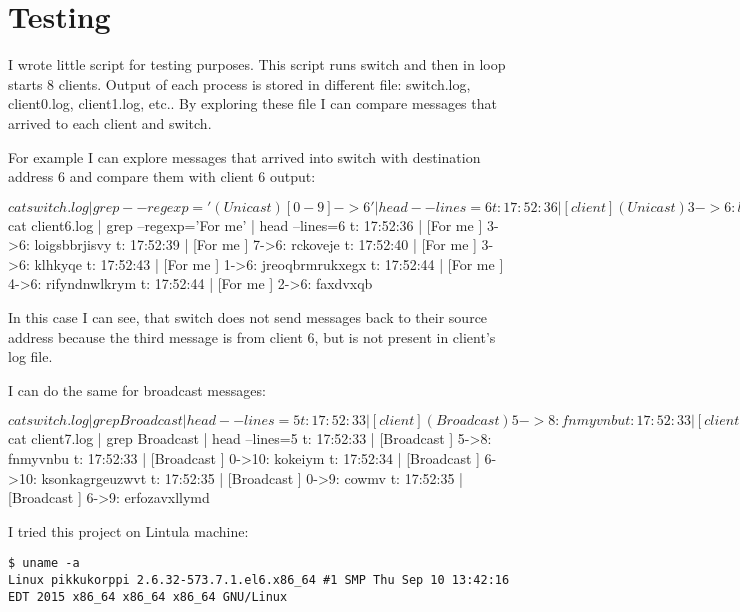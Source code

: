 \documentclass[11pt,a4paper,titlepage]{article}
\begin{document}
\section{Testing}
I wrote little script for testing purposes. This script runs switch and then in loop starts 8 clients. Output of each process is stored in different file: switch.log, client0.log, client1.log, etc.. By exploring these file I can compare messages that arrived to each client and switch.


For example I can explore messages that arrived into switch with destination address 6 and compare them with client 6 output:
\begin{bashcode}
$ cat switch.log | grep --regexp='(Unicast) [0-9]->6' | head --lines=6
t: 17:52:36 | [client] (Unicast) 3->6: loigsbbrjisvy
t: 17:52:39 | [client] (Unicast) 7->6: rckoveje
t: 17:52:40 | [client] (Unicast) 6->6: qhtfwyygvfj
t: 17:52:40 | [client] (Unicast) 3->6: klhkyqe
t: 17:52:43 | [client] (Unicast) 1->6: jreoqbrmrukxegx
t: 17:52:44 | [client] (Unicast) 4->6: rifyndnwlkrym

$ cat client6.log | grep --regexp='For me' | head --lines=6
t: 17:52:36 | [For me    ] 3->6: loigsbbrjisvy
t: 17:52:39 | [For me    ] 7->6: rckoveje
t: 17:52:40 | [For me    ] 3->6: klhkyqe
t: 17:52:43 | [For me    ] 1->6: jreoqbrmrukxegx
t: 17:52:44 | [For me    ] 4->6: rifyndnwlkrym
t: 17:52:44 | [For me    ] 2->6: faxdvxqb
\end{bashcode}
In this case I can see, that switch does not send messages back to their source address because the third message is from client 6, but is not present in client's log file.

I can do the same for broadcast messages:
\begin{bashcode}
$ cat switch.log | grep Broadcast | head --lines=5
t: 17:52:33 | [client] (Broadcast) 5->8: fnmyvnbu
t: 17:52:33 | [client] (Broadcast) 0->10: kokeiym
t: 17:52:34 | [client] (Broadcast) 6->10: ksonkagrgeuzwvt
t: 17:52:35 | [client] (Broadcast) 0->9: cowmv
t: 17:52:35 | [client] (Broadcast) 6->9: erfozavxllymd

$ cat client7.log | grep Broadcast | head --lines=5
t: 17:52:33 | [Broadcast ] 5->8: fnmyvnbu
t: 17:52:33 | [Broadcast ] 0->10: kokeiym
t: 17:52:34 | [Broadcast ] 6->10: ksonkagrgeuzwvt
t: 17:52:35 | [Broadcast ] 0->9: cowmv
t: 17:52:35 | [Broadcast ] 6->9: erfozavxllymd
\end{bashcode}

I tried this project on Lintula machine:
\begin{verbatim}
$ uname -a
Linux pikkukorppi 2.6.32-573.7.1.el6.x86_64 #1 SMP Thu Sep 10 13:42:16 
EDT 2015 x86_64 x86_64 x86_64 GNU/Linux
\end{verbatim}
\end{document}
